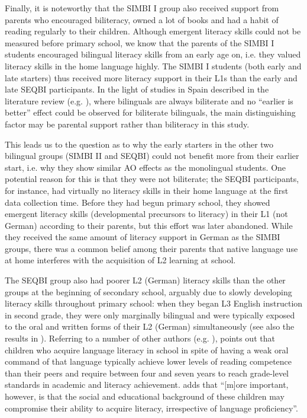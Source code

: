 \documentclass[output=paper,modfonts,nonflat,newtxmath]{langsci/langscibook}
\begin{document}
Finally, it is noteworthy that the SIMBI I group also received support from parents who encouraged biliteracy, owned a lot of books and had a habit of reading regularly to their children. Although emergent literacy skills could not be measured before primary school, we know that the parents of the SIMBI I students encouraged bilingual literacy skills from an early age on, i.e. they valued literacy skills in the home language highly. The SIMBI I students (both early and late starters) thus received more literacy support in their L1s than the early and late SEQBI participants. In the light of studies in Spain described in the literature review (e.g. \citealt{Sanz2008}), where bilinguals are always biliterate and no “earlier is better” effect could be observed for biliterate bilinguals, the main distinguishing factor may be parental support rather than biliteracy in this study.

This leads us to the question as to why the early starters in the other two bilingual groups (SIMBI II and SEQBI) could not benefit more from their earlier start, i.e. why they show similar AO effects as the monolingual students. One potential reason for this is that they were not biliterate; the SEQBI participants, for instance, had virtually no literacy skills in their home language at the first data collection time. Before they had begun primary school, they showed emergent literacy skills (developmental precursors to literacy) in their L1 (not German) according to their parents, but this effort was later abandoned. While they received the same amount of literacy support in German as the SIMBI groups, there was a common belief among their parents that native language use at home interferes with the acquisition of L2 learning at school.

The SEQBI group also had poorer L2 (German) literacy skills than the other groups at the beginning of secondary school, arguably due to slowly developing literacy skills throughout primary school: when they began L3 English instruction in second grade, they were only marginally bilingual and were typically exposed to the oral and written forms of their L2 (German) simultaneously (see also the results in \citealt{SánchezBardel2017}). Referring to a number of other authors (e.g. \citealt{Collier1987, Cummins1991, AugustHakuta1997}), \citet{Bialystok2007} points out that children who acquire language literacy in school in spite of having a weak oral command of that language typically achieve lower levels of reading competence than their peers and require between four and seven years to reach grade-level standards in academic and literacy achievement. \citet[22]{Bialystok2007} adds that “[m]ore important, however, is that the social and educational background of these children may compromise their ability to acquire literacy, irrespective of language proficiency”.
\end{document}
